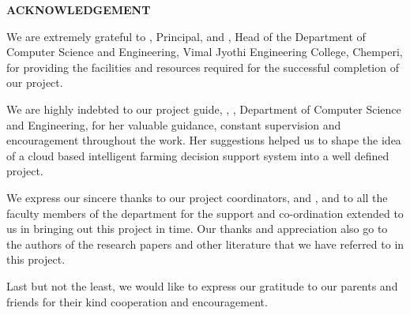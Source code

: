\newpage
\thispagestyle{plain}
\begin{center}
  \vspace*{30pt}
  {\fontsize{18}{22}\selectfont\textbf{ACKNOWLEDGEMENT}}\par
\end{center}
\vspace{10pt}

We are extremely grateful to \textbf{\principal}, Principal, and \textbf{\hod}, Head of the Department of Computer Science and Engineering, Vimal Jyothi Engineering College, Chemperi, for providing the facilities and resources required for the successful completion of our project.

We are highly indebted to our project guide, \textbf{\guide}, \guidedes, Department of Computer Science and Engineering, for her valuable guidance, constant supervision and encouragement throughout the work. Her suggestions helped us to shape the idea of a cloud based intelligent farming decision support system into a well defined project.

We express our sincere thanks to our project coordinators, \textbf{\projcordinatorA} and \textbf{\projcordinatorB}, and to all the faculty members of the department for the support and co-ordination extended to us in bringing out this project in time. Our thanks and appreciation also go to the authors of the research papers and other literature that we have referred to in this project.

Last but not the least, we would like to express our gratitude to our parents and friends for their kind cooperation and encouragement.

\vspace*{20pt}
\begin{flushright}
  \textbf{\studentA}\\
  \textbf{\studentB}\\
  \textbf{\studentC}\\
  \textbf{\studentD}
\end{flushright}
